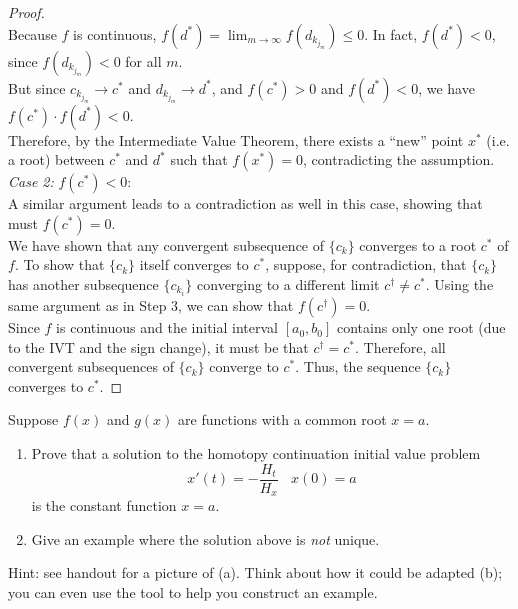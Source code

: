 \documentclass{article}
\begin{document}
\begin{proof}
\\
Because \( f \) is continuous, \( f(d^\ast) = \lim_{m \to \infty} f(d_{k_{j_m}}) \leq 0 \). In fact, \( f(d^\ast) < 0 \), since \( f(d_{k_{j_m}}) < 0 \) for all \( m \).
\\
But since \( c_{k_{j_m}} \to c^\ast \) and \( d_{k_{j_m}} \to d^\ast \), and \( f(c^\ast) > 0 \) and \( f(d^\ast) < 0 \), we have \( f(c^\ast) \cdot f(d^\ast) < 0 \).
\\
Therefore, by the Intermediate Value Theorem, there exists a ``new'' point \( x^\ast \) (i.e. a root) between \( c^\ast \) and \( d^\ast \) such that \( f(x^\ast) = 0 \), contradicting the assumption.
\\
\textit{Case 2:} \( f(c^\ast) < 0 \):
\\
A similar argument leads to a contradiction as well in this case, showing that must \( f(c^\ast) = 0 \).
\\
We have shown that any convergent subsequence of \( \{ c_k \} \) converges to a root \( c^\ast \) of \( f \). To show that \( \{ c_k \} \) itself converges to \( c^\ast \), suppose, for contradiction, that \( \{ c_k \} \) has another subsequence \( \{ c_{k_i} \} \) converging to a different limit \( c^\dagger \neq c^\ast \).
Using the same argument as in Step 3, we can show that \( f(c^\dagger) = 0 \).
\\
Since \( f \) is continuous and the initial interval \( [a_0, b_0] \) contains only one root (due to the IVT and the sign change), it must be that \( c^\dagger = c^\ast \). Therefore, all convergent subsequences of \( \{ c_k \} \) converge to \( c^\ast \). Thus, the sequence \( \{ c_k \} \) converges to \( c^\ast \).

\end{proof}


\begin{problem}
    Suppose \(f(x)\) and \(g(x)\) are functions with a common root \(x=a\).
    \begin{enumerate}[\hspace{2em}a)]
        \item Prove that a solution to the homotopy continuation initial value problem
    \[x'(t) = -\frac{H_t}{H_x}\ \ \ \ x(0) = a\]
    is the constant function \(x=a\).
        \item Give an example where the solution above is \emph{not} unique.
    \end{enumerate}

    Hint: see handout for a picture of (a). Think about how it could be adapted (b); you can even use the tool to help you construct an example.
\end{problem}
\end{document}
